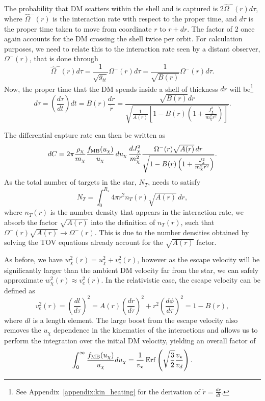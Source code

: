 The probability that DM scatters within the shell and is captured is $2\hat{\Omega}^-(r) d\tau$,
where $\hat{\Omega}^-(r)$ is the interaction rate with respect to the proper time, and $d\tau$ is the proper time taken to move from coordinate $r$ to $r + dr$. The factor of 2 once again accounts for the DM crossing the shell twice per orbit. For calculation purposes, we need to relate this to the interaction rate seen by a distant observer, $\Omega^-(r)$, that is done through
\begin{equation}
    \hat{\Omega}^-(r) d\tau = \frac{1}{\sqrt{g_{tt}}}\Omega^-(r)d\tau= \frac{1}{\sqrt{B(r)}}\Omega^-(r)d\tau.
\end{equation}
Now, the proper time that the DM spends inside a shell of thickness $dr$ will be\footnote{See Appendix~\ref{appendix:kin_heating} for the derivation of $\dot r = \frac{dr}{dt}$.}
\begin{equation}
    d\tau = \left( \frac{d\tau}{dt}\right) dt = B(r) \frac{dr}{\dot r} = \frac{\sqrt{B(r)} dr}{\sqrt{\frac{1}{A(r)} \left[ 1 - B(r)\left( 1 + \frac{J_\chi^2}{m_\chi^2 r^2} \right) \right]}}.
\end{equation}

The differential capture rate can then be written as 
\begin{equation}
    dC =  2\pi  \frac{\rho_\chi}{m_\chi}\frac{f_{\rm MB}(u_\chi)}{u_\chi}\,du_\chi\,\frac{dJ^2_\chi}{m_\chi^2} \frac{\Omega^-(r)\sqrt{A(r)} \,dr}{\sqrt{1 - B(r)\left( 1 + \frac{J_\chi^2}{m_\chi^2 r^2} \right)}}.
\end{equation}
As the total number of targets in the star, $N_T$, needs to satisfy
\begin{equation}
    N_T = \int_0^{R_\star} 4\pi r^2 n_T(r)\sqrt{A(r)}\,dr,
\end{equation}
where $n_T(r)$ is the number density that appears in the interaction rate, we absorb the factor $\sqrt{A(r)}$ into the definition of $n_T(r)$, such that $\Omega^-(r)\sqrt{A(r)}\rightarrow \Omega^-(r)$. This is due to the number densities obtained by solving the TOV equations already account for the $\sqrt{A(r)}$ factor. 

As before, we have $w_\chi^2(r) = u_\chi^2 + v_e^2(r)$, however as the escape velocity will be significantly larger than the ambient DM velocity far from the star, we can safely approximate $w_\chi^2(r)\approx v_e^2(r)$. 
In the relativistic case, the escape velocity can be defined as
\begin{equation}
    v_e^2(r) = \left(\frac{dl}{d\tau}\right)^2 = A(r) \left(\frac{dr}{d\tau}\right)^2 + r^2 \left(\frac{d\phi}{d\tau}\right)^2 = 1 - B(r),
    \label{ch3:eq:vesceq}
\end{equation}
where $dl$ is a length element. 
The large boost from the escape velocity also removes the $u_\chi$ dependence in the kinematics of the interactions and allows us to perform the integration over the initial DM velocity, yielding an overall factor of
\begin{equation}
    \int_0^\infty \frac{f_{\rm MB}(u_\chi)}{u_\chi} du_\chi = \frac{1}{v_\star}{\rm \,Erf}\left(\sqrt{\frac{3}{2}}\frac{v_\star}{v_d}\right).
\end{equation}

